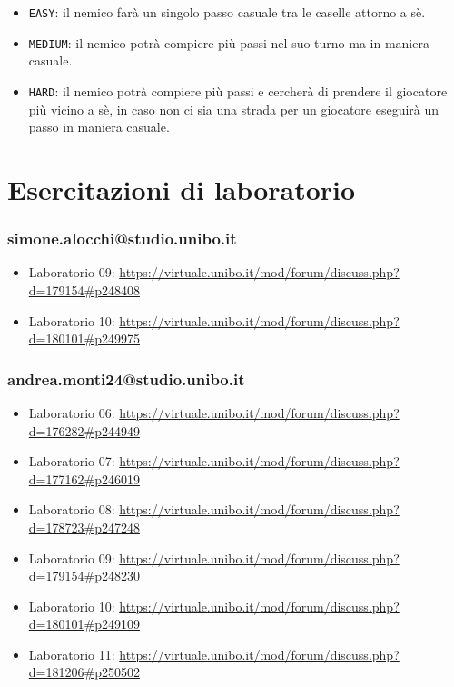 \documentclass[a4paper,12pt]{report}
\begin{document}
\begin{itemize}
	\item \texttt{EASY}: il nemico farà un singolo passo casuale tra le caselle attorno a sè.
	\item \texttt{MEDIUM}: il nemico potrà compiere più passi nel suo turno ma in maniera casuale.
	\item \texttt{HARD}: il nemico potrà compiere più passi e cercherà di prendere il giocatore più vicino a sè,
	in caso non ci sia una strada per un giocatore eseguirà un passo in maniera casuale.
\end{itemize}

\chapter{Esercitazioni di laboratorio}

\subsection{simone.alocchi@studio.unibo.it}

\begin{itemize}
 \item Laboratorio 09: \url{https://virtuale.unibo.it/mod/forum/discuss.php?d=179154#p248408}
 \item Laboratorio 10: \url{https://virtuale.unibo.it/mod/forum/discuss.php?d=180101#p249975}
\end{itemize}

\subsection{andrea.monti24@studio.unibo.it}

\begin{itemize}
 \item Laboratorio 06: \url{https://virtuale.unibo.it/mod/forum/discuss.php?d=176282#p244949}
 \item Laboratorio 07: \url{https://virtuale.unibo.it/mod/forum/discuss.php?d=177162#p246019}
 \item Laboratorio 08: \url{https://virtuale.unibo.it/mod/forum/discuss.php?d=178723#p247248}
 \item Laboratorio 09: \url{https://virtuale.unibo.it/mod/forum/discuss.php?d=179154#p248230}
 \item Laboratorio 10: \url{https://virtuale.unibo.it/mod/forum/discuss.php?d=180101#p249109}
 \item Laboratorio 11: \url{https://virtuale.unibo.it/mod/forum/discuss.php?d=181206#p250502}
\end{itemize}
\end{document}
